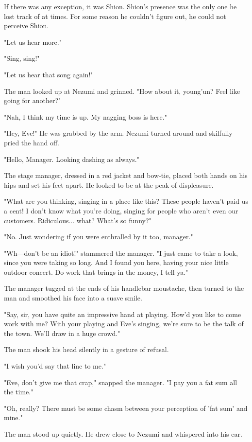 If there was any exception, it was Shion. Shion's presence was the only
one he lost track of at times. For some reason he couldn't figure out,
he could not perceive Shion.

"Let us hear more."

"Sing, sing!"

"Let us hear that song again!"

The man looked up at Nezumi and grinned. "How about it, young'un? Feel
like going for another?"

"Nah, I think my time is up. My nagging boss is here."

"Hey, Eve!" He was grabbed by the arm. Nezumi turned around and
skilfully pried the hand off.

"Hello, Manager. Looking dashing as always."

The stage manager, dressed in a red jacket and bow-tie, placed both
hands on his hips and set his feet apart. He looked to be at the peak of
displeasure.

"What are you thinking, singing in a place like this? These people
haven't paid us a cent! I don't know what you're doing, singing for
people who aren't even our customers. Ridiculous... what? What's so
funny?"

"No. Just wondering if you were enthralled by it too, manager."

"Wh---don't be an idiot!" stammered the manager. "I just came to take a
look, since you were taking so long. And I found you here, having your
nice little outdoor concert. Do work that brings in the money, I tell
ya."

The manager tugged at the ends of his handlebar moustache, then turned
to the man and smoothed his face into a suave smile.

"Say, sir, you have quite an impressive hand at playing. How'd you like
to come work with me? With your playing and Eve's singing, we're sure to
be the talk of the town. We'll draw in a huge crowd."

The man shook his head silently in a gesture of refusal.

"I wish you'd say that line to me."

"Eve, don't give me that crap," snapped the manager. "I pay you a fat
sum all the time."

"Oh, really? There must be some chasm between your perception of 'fat
sum' and mine."

The man stood up quietly. He drew close to Nezumi and whispered into his
ear.

